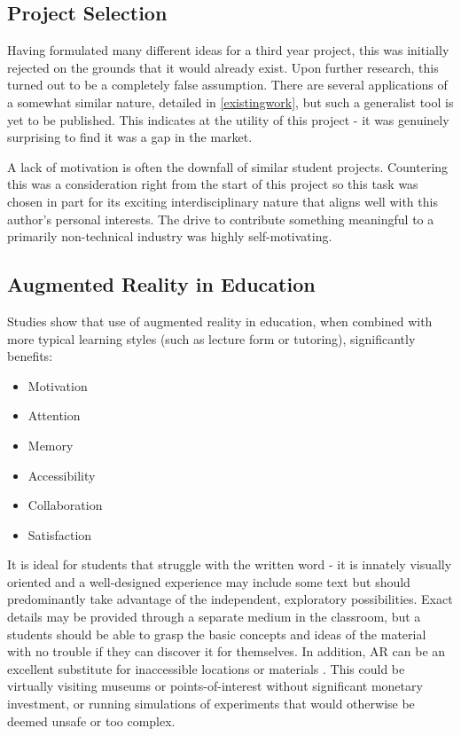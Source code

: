 \documentclass{article}
\begin{document}
\subsection{Project Selection}
Having formulated many different ideas for a third year project, this was initially rejected on the grounds that it would already exist. Upon further research, this turned out to be a completely false assumption. There are several applications of a somewhat similar nature, detailed in \ref{existingwork}, but such a generalist tool is yet to be published. This indicates at the utility of this project - it was genuinely surprising to find it was a gap in the market.

A lack of motivation is often the downfall of similar student projects. Countering this was a consideration right from the start of this project so this task was chosen in part for its exciting interdisciplinary nature that aligns well with this author's personal interests. The drive to contribute something meaningful to a primarily non-technical industry was highly self-motivating.

\subsection{Augmented Reality in Education}
Studies show that use of augmented reality in education, when combined with more typical learning styles (such as lecture form or tutoring), significantly benefits: \cite{education:ARlit}

\begin{itemize}
    \item Motivation
    \item Attention
    \item Memory
    \item Accessibility
    \item Collaboration
    \item Satisfaction
\end{itemize}

It is ideal for students that struggle with the written word \cite{education:class} - it is innately visually oriented and a well-designed experience may include some text but should predominantly take advantage of the independent, exploratory possibilities. Exact details may be provided through a separate medium in the classroom, but a students should be able to grasp the basic concepts and ideas of the material with no trouble if they can discover it for themselves. In addition, AR can be an excellent substitute for inaccessible locations or materials \cite{education:placespotentials}. This could be virtually visiting museums or points-of-interest without significant monetary investment, or running simulations of experiments that would otherwise be deemed unsafe or too complex.
\end{document}
